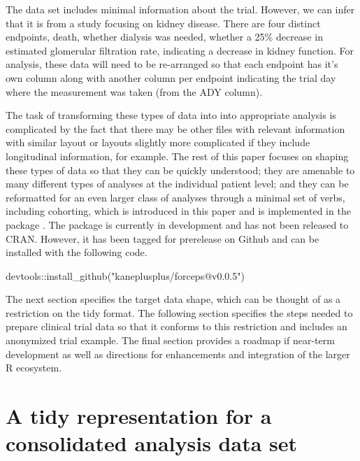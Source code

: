 The data set includes minimal information about the trial. However, we
can infer that it is from a study focusing on kidney disease. There are
four distinct endpoints, death, whether dialysis was needed, whether a
25\% decrease in estimated glomerular filtration rate, indicating a
decrease in kidney function. For analysis, these data will need to be
re-arranged so that each endpoint has it's own column along with another
column per endpoint indicating the trial day where the measurement was
taken (from the ADY column).

The task of transforming these types of data into into appropriate
analysis is complicated by the fact that there may be other files with
relevant information with similar layout or layouts slightly more
complicated if they include longitudinal information, for example. The
rest of this paper focuses on shaping these types of data so that they
can be quickly understood; they are amenable to many different types of
analyses at the individual patient level; and they can be reformatted
for an even larger class of analyses through a minimal set of verbs,
including cohorting, which is introduced in this paper and is
implemented in the  package \citep{forceps}. The package is
currently in development and has not been released to CRAN. However, it
has been tagged for prerelease on Github and can be installed with the
following code.

\begin{Schunk}
\begin{Sinput}
devtools::install_github("kaneplusplus/forceps@v0.0.5")
\end{Sinput}
\end{Schunk}

\noindent The next section specifies the target data shape, which can be
thought of as a restriction on the tidy format. The following section
specifies the steps needed to prepare clinical trial data so that it
conforms to this restriction and includes an anonymized trial example.
The final section provides a roadmap if near-term development as well as
directions for enhancements and integration of the larger R ecosystem.

\hypertarget{a-tidy-representation-for-a-consolidated-analysis-data-set}{%
\section{A tidy representation for a consolidated analysis data
set}\label{a-tidy-representation-for-a-consolidated-analysis-data-set}}

